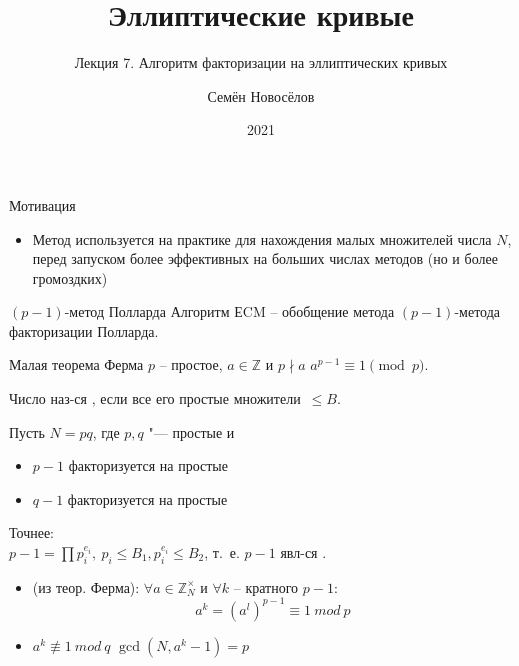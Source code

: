 \documentclass{beamer}
\title{Эллиптические кривые}
\subtitle{Лекция 7. Алгоритм факторизации на эллиптических кривых}
\author{Семён Новосёлов}
\institute{БФУ им. И. Канта}
\date{2021}
\begin{document}
\frame{\titlepage}

\begin{frame}{Мотивация}
\begin{itemize}
    \item Метод используется на практике для нахождения малых множителей числа $N$, перед запуском более эффективных на больших числах методов (но и более громоздких)
\end{itemize}
\end{frame}

\begin{frame}{$(p-1)$-метод Полларда}
    Алгоритм ЕCM -- обобщение метода $(p-1)$-метода факторизации Полларда.
    \vspace{1em}
    \begin{block}{Малая теорема Ферма}
        $p$ -- простое, $a \in \mathbb{Z}$ и $p \nmid a$ \MyImplies $a^{p-1} \equiv 1 \pmod{p}$.
    \end{block}
    \vspace{1em}

    Число наз-ся , если все его простые множители~$\leq B$.
\end{frame}

\begin{frame}%
Пусть $N = p q$, где $p, q$ "--- простые и
\begin{itemize}
  \item $p-1$ факторизуется на  простые\\
  \item $q-1$  факторизуется на  простые
\end{itemize}

Точнее:\\
$p-1 = \prod p_i^{e_i},\ p_i \leq B_1, p_i^{e_i} \leq B_2$, т.~е. $p-1$ явл-ся .

\vspace{1em}
\begin{itemize}
    \item (из теор. Ферма): $\forall a \in \mathbb{Z}_N^\times$ и $\forall k$ -- кратного $p-1$:
    \[
    a^k = (a^l)^{p-1} \equiv 1\ mod\ p
    \]
    \item $a^k \not\equiv 1\ mod\ q$ \structure{$\implies$} $\gcd(N, a^k - 1) = p$
\end{itemize}
\end{frame}
\end{document}

